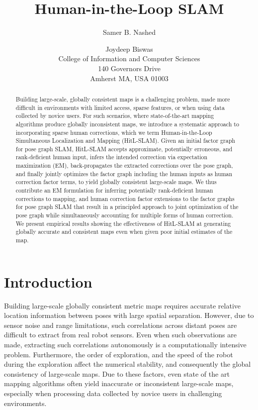 \documentclass[letterpaper]{article} %
\title{Human-in-the-Loop SLAM}
\author{Samer B. Nashed \and Joydeep Biswas \\
  College of Information and Computer Sciences\\
  140 Governors Drive\\
  Amherst MA, USA 01003
}
\theoremstyle{definition}
\begin{document}
\maketitle

\begin{abstract}
Building large-scale, globally consistent maps is a challenging problem, made more
 difficult in environments with limited access, sparse
features, or when using data collected by novice users. For such scenarios,
where state-of-the-art mapping algorithms produce globally inconsistent maps, we
introduce a systematic approach to
incorporating sparse human corrections, which we term Human-in-the-Loop
Simultaneous Localization and Mapping (HitL-SLAM). Given an initial
factor graph for pose graph SLAM, HitL-SLAM accepts approximate, potentially
erroneous, and rank-deficient human input, infers the intended correction via
expectation maximization (EM), back-propagates the extracted corrections over
the pose graph, and finally jointly optimizes the factor graph including
the human inputs as human correction factor terms, to yield globally consistent large-scale maps.
We thus contribute an EM formulation for inferring potentially
rank-deficient human corrections to mapping, and human correction factor extensions to the
factor graphs for pose graph SLAM that result in a principled approach to joint
optimization of the pose graph while simultaneously accounting for multiple
forms of human correction. We present empirical results showing the
effectiveness of HitL-SLAM at generating globally accurate and consistent maps
even when given poor initial estimates of the map.
\end{abstract}

\section{Introduction}

Building large-scale globally consistent metric maps requires accurate relative
location information between poses with large spatial separation. However, due
to sensor noise and range limitations, such correlations across distant poses
are difficult to extract from real robot sensors. Even when such observations
are made, extracting such correlations autonomously is a computationally
intensive problem. Furthermore, the order of exploration, and the speed of the
robot during the exploration affect the numerical stability, and consequently
the global consistency of large-scale maps. Due to these factors, even state of
the art mapping algorithms often yield inaccurate or inconsistent large-scale
maps, especially when processing data collected by novice users in challenging
environments.
\end{document}
